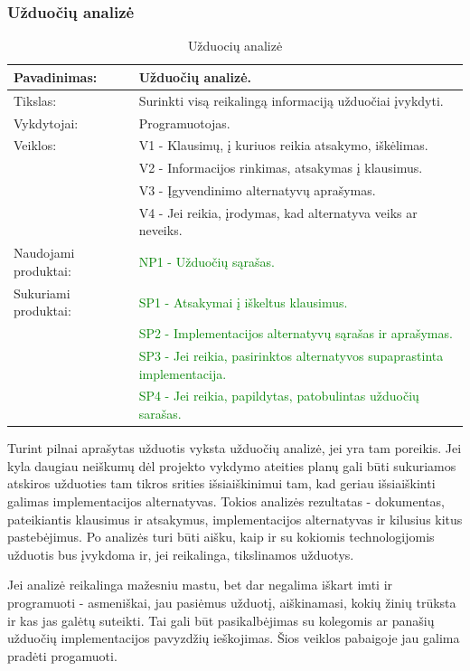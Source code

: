 \documentclass{VUMIFPSkursinis}
\begin{document}
	\subsubsection{Užduočių analizė}
	\begin{center}
		\begin{table}[ht]
			\caption{Užduocių analizė}
			\begin{tabular}{ | l | l | }
				\hline
				Pavadinimas:		& Užduočių analizė.								\\ \hline
				Tikslas:		& Surinkti visą reikalingą informaciją užduočiai įvykdyti.			\\ \hline
				Vykdytojai:		& Programuotojas.								\\ \hline
				Veiklos:		& V1 - Klausimų, į kuriuos reikia atsakymo, iškėlimas.				\\
							& V2 - Informacijos rinkimas, atsakymas į klausimus.				\\
							& V3 - Įgyvendinimo alternatyvų aprašymas.					\\
							& V4 - Jei reikia, įrodymas, kad alternatyva veiks ar neveiks.			\\ \hline
				Naudojami produktai:	&\textcolor{green}{ NP1 - Užduočių sąrašas. }							\\ \hline
				Sukuriami produktai:	& \textcolor{green}{SP1 - Atsakymai į iškeltus klausimus.}						\\
							& \textcolor{green}{SP2 - Implementacijos alternatyvų sąrašas ir aprašymas.	}		\\
							& \textcolor{green}{SP3 - Jei reikia, pasirinktos alternatyvos supaprastinta implementacija.}	\\
							& \textcolor{green}{SP4 - Jei reikia, papildytas, patobulintas užduočių sarašas.}			\\ \hline
			\end{tabular}
		\end{table}
	\end{center}
	Turint pilnai aprašytas užduotis vyksta užduočių analizė, jei yra tam poreikis.
	Jei kyla daugiau neiškumų dėl projekto vykdymo ateities planų gali būti sukuriamos atskiros užduoties tam tikros srities išsiaiškinimui tam, kad geriau išsiaiškinti galimas implementacijos alternatyvas.
	Tokios analizės rezultatas - dokumentas, pateikiantis klausimus ir atsakymus, implementacijos alternatyvas ir kilusius kitus pastebėjimus.
	Po analizės turi būti aišku, kaip ir su kokiomis technologijomis užduotis bus įvykdoma ir, jei reikalinga, tikslinamos užduotys.
	\par
	Jei analizė reikalinga mažesniu mastu, bet dar negalima iškart imti ir programuoti - asmeniškai, jau pasiėmus užduotį, aiškinamasi, kokių žinių trūksta ir kas jas galėtų suteikti.
	Tai gali būt pasikalbėjimas su kolegomis ar panašių užduočių implementacijos pavyzdžių ieškojimas.
	Šios veiklos pabaigoje jau galima pradėti progamuoti.
\end{document}
